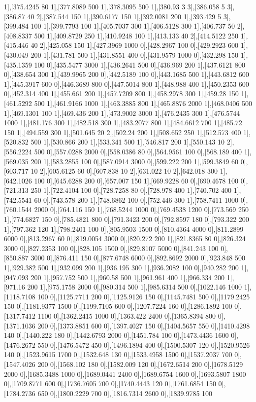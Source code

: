 {1],[375.4245 80 1],[377.8089 500 1],[378.3095 500 1],[380.93 3 3],[386.058 5 3],[386.87 40 2],[387.544 150 1],[390.6177 150 1],[392.0081 200 1],[393.429 5 3],[399.484 100 1],[399.7793 100 1],[405.7037 300 1],[406.5128 300 1],[406.737 50 2],[408.8337 500 1],[409.8729 250 1],[410.9248 100 1],[413.133 40 2],[414.5122 250 1],[415.446 40 2],[425.058 150 1],[427.3969 1000 0],[428.2967 100 0],[429.2923 600 1],[430.049 200 1],[431.781 500 1],[431.8551 400 0],[431.9579 1000 0],[432.298 150 1],[435.1359 100 0],[435.5477 3000 1],[436.2641 500 0],[436.969 200 1],[437.6121 800 0],[438.654 300 1],[439.9965 200 0],[442.5189 100 0],[443.1685 500 1],[443.6812 600 1],[445.3917 600 0],[446.3689 800 0],[447.5014 800 1],[448.988 400 1],[450.2353 600 0],[452.314 400 1],[455.661 200 1],[457.7209 800 1],[458.2978 300 1],[459.28 150 1],[461.5292 500 1],[461.9166 1000 1],[463.3885 800 1],[465.8876 2000 1],[468.0406 500 1],[469.1301 100 1],[469.436 200 1],[473.9002 3000 1],[476.2435 300 1],[476.5744 1000 1],[481.176 300 1],[482.518 300 1],[483.2077 800 1],[484.6612 700 1],[485.72 150 1],[494.559 300 1],[501.645 20 2],[502.24 200 1],[508.652 250 1],[512.573 400 1],[520.832 500 1],[530.866 200 1],[533.341 500 1],[546.817 200 1],[550.143 10 2],[556.2224 500 0],[557.0288 2000 0],[558.0386 80 0],[564.9561 100 0],[568.189 400 1],[569.035 200 1],[583.2855 100 0],[587.0914 3000 0],[599.222 200 1],[599.3849 60 0],[603.717 10 2],[605.6125 60 0],[607.838 10 2],[631.022 10 2],[642.018 300 1],[642.1026 100 0],[645.6288 200 0],[657.007 150 1],[669.9228 60 0],[690.4678 100 0],[721.313 250 1],[722.4104 100 0],[728.7258 80 0],[728.978 400 1],[740.702 400 1],[742.5541 60 0],[743.578 200 1],[748.6862 100 0],[752.446 300 1],[758.7411 1000 0],[760.1544 2000 0],[764.116 150 1],[768.5244 1000 0],[769.4538 1200 0],[773.569 250 1],[774.6827 150 0],[785.4821 800 0],[791.3423 200 0],[792.8597 180 0],[793.322 200 1],[797.362 120 1],[798.2401 100 0],[805.9503 1500 0],[810.4364 4000 0],[811.2899 6000 0],[813.2967 60 0],[819.0054 3000 0],[820.272 200 1],[821.8365 80 0],[826.324 3000 0],[827.2353 100 0],[828.105 1500 0],[829.8107 5000 0],[841.243 100 0],[850.887 3000 0],[876.411 150 0],[877.6748 6000 0],[892.8692 2000 0],[923.848 500 1],[929.382 500 1],[932.099 200 1],[936.195 300 1],[936.2082 100 0],[940.282 200 1],[947.093 200 1],[957.752 500 1],[960.58 500 1],[961.961 400 1],[966.334 200 1],[971.16 200 1],[975.1758 2000 0],[980.314 500 1],[985.6314 500 0],[1022.146 1000 1],[1118.7108 100 0],[1125.7711 200 0],[1125.9126 150 0],[1145.7481 500 0],[1179.2425 150 0],[1181.9377 1500 0],[1199.7105 600 0],[1207.7224 160 0],[1286.1892 100 0],[1317.7412 1100 0],[1362.2415 1000 0],[1363.422 2400 0],[1365.8394 800 0],[1371.1036 200 0],[1373.8851 600 0],[1397.4027 150 0],[1404.5657 550 0],[1410.4298 140 0],[1440.222 180 0],[1442.6793 2000 0],[1451.784 100 0],[1473.4436 1600 0],[1476.2672 550 0],[1476.5472 450 0],[1496.1894 400 0],[1500.5307 120 0],[1520.9526 140 0],[1523.9615 1700 0],[1532.648 130 0],[1533.4958 1500 0],[1537.2037 700 0],[1547.4026 200 0],[1568.102 180 0],[1582.009 120 0],[1672.6514 200 0],[1678.5129 2000 0],[1685.3488 1000 0],[1689.0441 2400 0],[1689.6754 1600 0],[1693.5807 1800 0],[1709.8771 600 0],[1736.7605 700 0],[1740.4443 120 0],[1761.6854 150 0],[1784.2736 650 0],[1800.2229 700 0],[1816.7314 2600 0],[1839.9785 100 }
